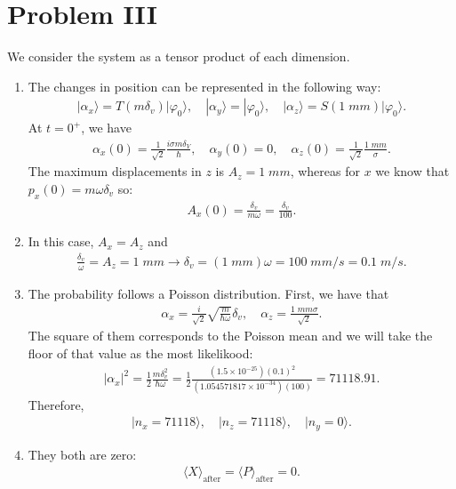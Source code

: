 \documentclass[letterpaper,11pt,twoside]{article}
\newcommand{\ket}[1]{|#1\rangle}
\newcommand{\braket}[1]{\langle#1\rangle}
\begin{document}
\section*{Problem III}
We consider the system as a tensor product of each dimension.
\begin{enumerate}[itemsep=0pt,topsep=0pt,label=\alph*)]
  \item The changes in position can be represented in the following way:
  \begin{align*}
    \ket{\alpha_x}=T(m\delta_v)\ket{\varphi_0},\quad\ket{\alpha_y}=\ket{\varphi_0},\quad\ket{\alpha_z}=S(1\;mm)\ket{\varphi_0}.
  \end{align*}
  At $t=0^+$, we have
  \begin{align*}
    \alpha_x(0)=\frac{1}{\sqrt{2}}\frac{i\sigma m\delta_V}{\hbar},\quad\alpha_y(0)=0,\quad\alpha_z(0)=\frac{1}{\sqrt{2}}\frac{1\;mm}{\sigma}.
  \end{align*}
  The maximum displacements in $z$ is $A_z=1\;mm$, whereas for $x$ we know that $p_x(0)=m\omega\delta_v$ so:
  \begin{align*}
    A_x(0)=\frac{\delta_v}{m\omega}=\frac{\delta_v}{100}.
  \end{align*}
  \item In this case, $A_x=A_z$ and 
  \begin{align*}
    \frac{\delta_v}{\omega}=A_z=1\;mm\longrightarrow\delta_v=(1\;mm)\omega=100\;mm/s=0.1\;m/s.
  \end{align*}
  \item The probability follows a Poisson distribution. First, we have that 
  \begin{align*}
    \alpha_x=\frac{i}{\sqrt{2}}\sqrt{\frac{m}{\hbar\omega}}\delta_v,\quad\alpha_z=\frac{1\;mm\sigma}{\sqrt{2}}.
  \end{align*}
  The square of them corresponds to the Poisson mean and we will take the floor of that value as the most likelikood:
  \begin{align*}
    |\alpha_x|^2=\frac{1}{2}\frac{m\delta_v^2}{\hbar\omega}=\frac{1}{2}\frac{(1.5\times10^{-25})(0.1)^2}{(1.054571817\times10^{-34})(100)}=71118.91.
  \end{align*}
  Therefore,
  \begin{align*}
    \ket{n_x=71118},\quad\ket{n_z=71118},\quad\ket{n_y=0}.
  \end{align*}
  \item They both are zero:
  \begin{align*}
    \braket{X}_{\text{after}}=\braket{P}_{\text{after}}=0.
  \end{align*}

\end{enumerate}
\end{document}
